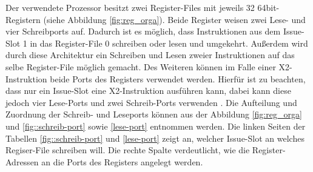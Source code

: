 %			
Der verwendete Prozessor besitzt zwei Register-Files mit jeweils 32 64bit-Registern (siehe Abbildung \ref{fig:reg_orga}). Beide Register weisen zwei Lese- und vier Schreibports auf. Dadurch ist es möglich, dass Instruktionen aus dem Issue-Slot 1 in das Register-File 0 schreiben oder lesen und umgekehrt. Außerdem wird durch diese Architektur ein Schreiben und Lesen zweier Instruktionen auf das selbe Register-File möglich gemacht. Des Weiteren können im Falle einer X2-Instruktion beide Ports des Registers verwendet werden. Hierfür ist zu beachten, dass nur ein Issue-Slot eine X2-Instruktion ausführen kann, dabei kann diese jedoch vier Lese-Ports und zwei Schreib-Ports verwenden \cite{paya2010multi}. Die Aufteilung und  Zuordnung der Schreib- und Leseports können aus der Abbildung \ref{fig:reg_orga} und \ref{fig::schreib-port} sowie \ref{lese-port} entnommen werden. Die linken Seiten der Tabellen \ref{fig::schreib-port} und \ref{lese-port} zeigt an, welcher Issue-Slot an welches Regiser-File schreiben will. Die rechte Spalte verdeutlicht, wie die Register-Adressen an die Ports des Registers angelegt werden.


